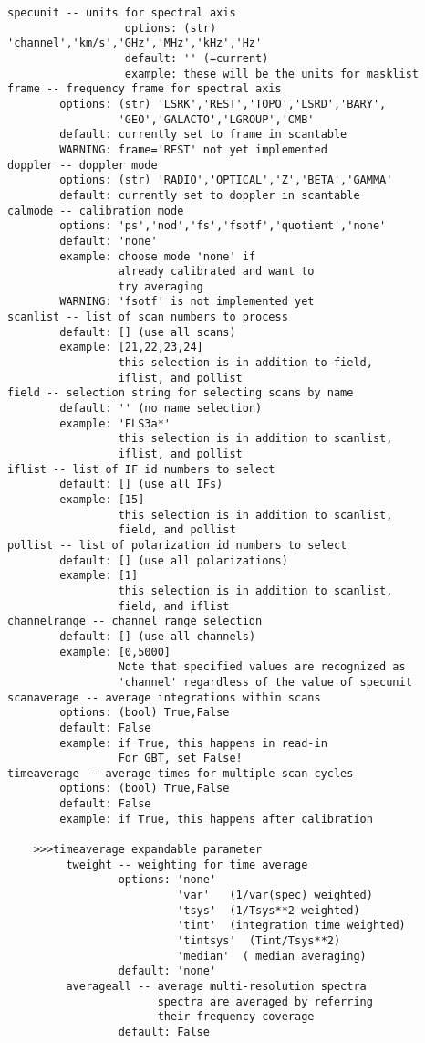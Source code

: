 \begin{verbatim}
specunit -- units for spectral axis
                  options: (str) 'channel','km/s','GHz','MHz','kHz','Hz'
                  default: '' (=current)
                  example: these will be the units for masklist
frame -- frequency frame for spectral axis
        options: (str) 'LSRK','REST','TOPO','LSRD','BARY',
                 'GEO','GALACTO','LGROUP','CMB'
        default: currently set to frame in scantable
        WARNING: frame='REST' not yet implemented    
doppler -- doppler mode
        options: (str) 'RADIO','OPTICAL','Z','BETA','GAMMA'
        default: currently set to doppler in scantable
calmode -- calibration mode
        options: 'ps','nod','fs','fsotf','quotient','none'
        default: 'none'
        example: choose mode 'none' if
                 already calibrated and want to
                 try averaging
        WARNING: 'fsotf' is not implemented yet
scanlist -- list of scan numbers to process
        default: [] (use all scans)
        example: [21,22,23,24]
                 this selection is in addition to field,
                 iflist, and pollist
field -- selection string for selecting scans by name
        default: '' (no name selection)
        example: 'FLS3a*'
                 this selection is in addition to scanlist,
                 iflist, and pollist
iflist -- list of IF id numbers to select
        default: [] (use all IFs)
        example: [15]
                 this selection is in addition to scanlist,
                 field, and pollist
pollist -- list of polarization id numbers to select
        default: [] (use all polarizations)
        example: [1]
                 this selection is in addition to scanlist,
                 field, and iflist
channelrange -- channel range selection
        default: [] (use all channels)
        example: [0,5000]
                 Note that specified values are recognized as
                 'channel' regardless of the value of specunit
scanaverage -- average integrations within scans
        options: (bool) True,False
        default: False
        example: if True, this happens in read-in
                 For GBT, set False!
timeaverage -- average times for multiple scan cycles
        options: (bool) True,False
        default: False
        example: if True, this happens after calibration
        
    >>>timeaverage expandable parameter
         tweight -- weighting for time average
                 options: 'none'
                          'var'   (1/var(spec) weighted)
                          'tsys'  (1/Tsys**2 weighted)
                          'tint'  (integration time weighted)
                          'tintsys'  (Tint/Tsys**2)
                          'median'  ( median averaging)
                 default: 'none'
         averageall -- average multi-resolution spectra
                       spectra are averaged by referring
                       their frequency coverage
                 default: False


\end{verbatim}
